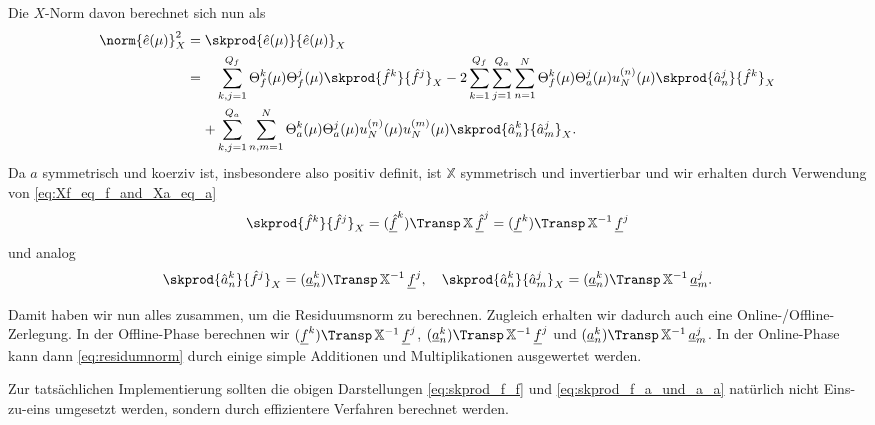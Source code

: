 Die $X$-Norm davon berechnet sich nun als
\begin{align}
    \label{eq:residumnorm}
    \norm{\hat e(\mu)}^2_X
    &= \skprod{\hat e(\mu)}{\hat e(\mu)}_X \\
    &=
    \begin{aligned}[t]
    &\sum_{k, j = 1}^{Q_f} \Theta_f^k(\mu) \Theta_f^j(\mu) \skprod{\hat f^k}{\hat f^j}_X - 2 \sum_{k = 1}^{Q_f} \sum_{j = 1}^{Q_a} \sum_{n = 1}^N \Theta_f^k(\mu) \Theta_a^j(\mu) u_N^{(n)}(\mu) \skprod{\hat a^j_n}{\hat f^k}_X \\
    + &\sum_{k, j = 1}^{Q_a} \sum_{n, m = 1}^N \Theta_a^k(\mu) \Theta_a^j(\mu) u_N^{(n)}(\mu)u_N^{(m)}(\mu) \skprod{\hat a_n^k}{\hat a_m^j}_X.
    \end{aligned}
\end{align}
Da $a$ symmetrisch und koerziv ist, insbesondere also positiv definit, ist $\mathbb{X}$ symmetrisch und invertierbar und wir erhalten durch Verwendung von \eqref{eq:Xf_eq_f_and_Xa_eq_a}
\begin{equation}
    \label{eq:skprod_f_f}
    \skprod{\hat f^k}{\hat f^j}_X = (\underline{\hat{f}}^k)\Transp \, \mathbb{X} \, \underline{\hat{f}}^j = (\underline f^k)\Transp \, \mathbb{X}^{-1} \, \underline f^j
\end{equation}
und analog
\begin{equation}
    \label{eq:skprod_f_a_und_a_a}
    \skprod{\hat a^k_n}{\hat f^j}_X = (\underline a^k_n)\Transp \, \mathbb{X}^{-1} \, \underline f^j,
    \quad \skprod{\hat a^k_n}{\hat a^j_m}_X = (\underline a^k_n)\Transp \, \mathbb{X}^{-1} \, \underline a^j_m.
\end{equation}

Damit haben wir nun alles zusammen, um die Residuumsnorm zu berechnen. Zugleich erhalten wir dadurch auch eine Online-/Offline-Zerlegung. In der Offline-Phase berechnen wir $(\underline f^k)\Transp \, \mathbb{X}^{-1} \, \underline f^j$, $(\underline a^k_n)\Transp \, \mathbb{X}^{-1} \, \underline f^j$ und $(\underline a^k_n)\Transp \, \mathbb{X}^{-1} \, \underline a^j_m$. In der Online-Phase kann dann \eqref{eq:residumnorm} durch einige simple Additionen und Multiplikationen ausgewertet werden.

Zur tatsächlichen Implementierung sollten die obigen Darstellungen \eqref{eq:skprod_f_f} und \eqref{eq:skprod_f_a_und_a_a} natürlich nicht Eins-zu-eins umgesetzt werden, sondern durch effizientere Verfahren berechnet werden.

